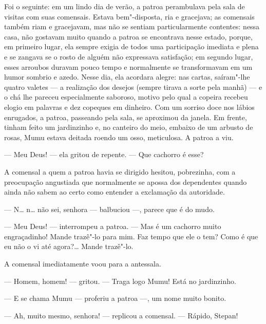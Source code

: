 Foi o seguinte: em um lindo dia de verão, a patroa perambulava pela sala
de visitas com suas comensais. Estava bem"-disposta, ria e gracejava; as
comensais também riam e gracejavam, mas não se sentiam particularmente
contentes: nessa casa, não gostavam muito quando a patroa se encontrava
nesse estado, porque, em primeiro lugar, ela sempre exigia de todos uma
participação imediata e plena e se zangava se o rosto de alguém não
expressava satisfação; em segundo lugar, esses arroubos duravam pouco
tempo e normalmente se transformavam em um humor sombrio e azedo. Nesse
dia, ela acordara alegre: nas cartas, saíram"-lhe quatro valetes --- a
realização dos desejos (sempre tirava a sorte pela manhã) --- e o chá
lhe pareceu especialmente saboroso, motivo pelo qual a copeira recebeu
elogio em palavras e dez copeques em dinheiro. Com um sorriso doce nos
lábios enrugados, a patroa, passeando pela sala, se aproximou da janela.
Em frente, tinham feito um jardinzinho e, no canteiro do meio, embaixo
de um arbusto de rosas, Mumu estava deitada roendo um osso, meticulosa.
A patroa a viu.

--- Meu Deus! --- ela gritou de repente. --- Que cachorro é esse?

A comensal a quem a patroa havia se dirigido hesitou, pobrezinha, com a
preocupação angustiada que normalmente se apossa dos dependentes quando
ainda não sabem ao certo como entender a exclamação da autoridade.

--- N\ldots{} n\ldots{} não sei, senhora --- balbuciou ---, parece que é do mudo.

--- Meu Deus! --- interrompeu a patroa. --- Mas é um cachorro muito
engraçadinho! Mande trazê"-lo para mim. Faz tempo que ele o tem? Como é
que eu não o vi até agora?\ldots{} Mande trazê"-lo.

A comensal imediatamente voou para a antessala.

--- Homem, homem! --- gritou. --- Traga logo Mumu! Está no jardinzinho.

--- E se chama Mumu --- proferiu a patroa ---, um nome muito bonito.

--- Ah, muito mesmo, senhora! --- replicou a comensal. --- Rápido,
Stepan!


